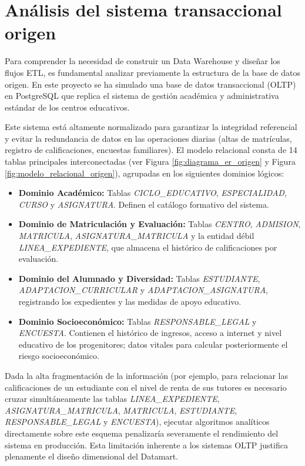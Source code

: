 \section{Análisis del sistema transaccional origen}

Para comprender la necesidad de construir un Data Warehouse y diseñar los flujos ETL, es fundamental analizar previamente la estructura de la base de datos origen. En este proyecto se ha simulado una base de datos transaccional (OLTP) en PostgreSQL que replica el sistema de gestión académica y administrativa estándar de los centros educativos.

Este sistema está altamente normalizado para garantizar la integridad referencial y evitar la redundancia de datos en las operaciones diarias (altas de matrículas, registro de calificaciones, encuestas familiares). El modelo relacional consta de 14 tablas principales interconectadas (ver Figura \ref{fig:diagrama_er_origen} y Figura \ref{fig:modelo_relacional_origen}), agrupadas en los siguientes dominios lógicos:

\begin{itemize}
    \item \textbf{Dominio Académico:} Tablas \textit{CICLO\-\_EDUCATIVO}, \textit{ESPECIALIDAD}, \textit{CURSO} y \textit{ASIGNATURA}. Definen el catálogo formativo del sistema.
    \item \textbf{Dominio de Matriculación y Evaluación:} Tablas \textit{CENTRO}, \textit{ADMISION}, \textit{MATRICULA}, \textit{ASIGNATURA\-\_MATRICULA} y la entidad débil \textit{LINEA\-\_EXPEDIENTE}, que almacena el histórico de calificaciones por evaluación.
    \item \textbf{Dominio del Alumnado y Diversidad:} Tablas \textit{ESTUDIANTE}, \textit{ADAPTACION\-\_CURRICULAR} y \textit{ADAPTACION\-\_ASIGNATURA}, registrando los expedientes y las medidas de apoyo educativo.
    \item \textbf{Dominio Socioeconómico:} Tablas \textit{RESPONSABLE\-\_LEGAL} y \textit{ENCUESTA}. Contienen el histórico de ingresos, acceso a internet y nivel educativo de los progenitores; datos vitales para calcular posteriormente el riesgo socioeconómico.
\end{itemize}

Dada la alta fragmentación de la información (por ejemplo, para relacionar las calificaciones de un estudiante con el nivel de renta de sus tutores es necesario cruzar simultáneamente las tablas \textit{LINEA\-\_EXPEDIENTE}, \textit{ASIGNATURA\-\_MATRICULA}, \textit{MATRICULA}, \textit{ESTUDIANTE}, \textit{RESPONSABLE\-\_LEGAL} y \textit{ENCUESTA}), ejecutar algoritmos analíticos directamente sobre este esquema penalizaría severamente el rendimiento del sistema en producción. Esta limitación inherente a los sistemas OLTP justifica plenamente el diseño dimensional del Datamart.

